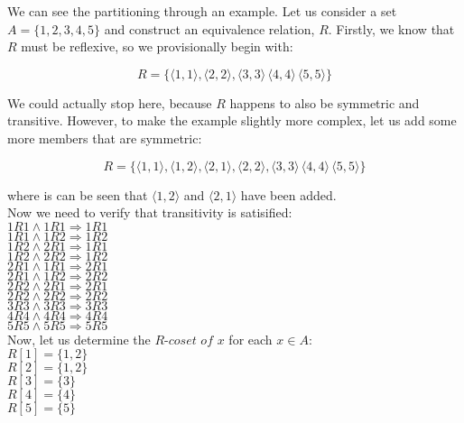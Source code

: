 We can see the partitioning through an example.  Let us consider a set $A=\{1,2,3,4,5\}$ and construct an equivalence relation, $R$.  Firstly, we know that $R$ must be reflexive, so we provisionally begin with:

\begin{displaymath}
R=\{ \langle 1,1 \rangle, \langle 2,2 \rangle, \langle 3,3 \rangle\, \langle 4,4 \rangle\, \langle 5,5 \rangle\}
\end{displaymath}

We could actually stop here, because $R$ happens to also be symmetric and transitive.  However, to make the example slightly more complex, let us add some more members that are symmetric:

\begin{displaymath}
R=\{ \langle 1,1 \rangle,  \langle 1,2 \rangle, \langle 2,1 \rangle, \langle 2,2 \rangle, \langle 3,3 \rangle\, \langle 4,4 \rangle\, \langle 5,5 \rangle\}
\end{displaymath}

where is can be seen that $\langle 1,2 \rangle$ and $\langle 2,1 \rangle$ have been added.\\
Now we need to verify that transitivity is satisified:\\
$1R1 \land 1R1 \Longrightarrow 1R1$ \\
$1R1 \land 1R2 \Longrightarrow 1R2$ \\
$1R2 \land 2R1 \Longrightarrow 1R1$ \\
$1R2 \land 2R2 \Longrightarrow 1R2$ \\
$2R1 \land 1R1 \Longrightarrow 2R1$ \\
$2R1 \land 1R2 \Longrightarrow 2R2$ \\
$2R2 \land 2R1 \Longrightarrow 2R1$ \\
$2R2 \land 2R2 \Longrightarrow 2R2$ \\
$3R3 \land 3R3 \Longrightarrow 3R3$ \\
$4R4 \land 4R4 \Longrightarrow 4R4$ \\
$5R5 \land 5R5 \Longrightarrow 5R5$ \\


Now, let us determine the $R \textit{-coset of }x$ for each $x \in A$:\\
$R[1]=\{1,2\}$\\
$R[2]=\{1,2\}$\\
$R[3]=\{3\}$\\
$R[4]=\{4\}$\\
$R[5]=\{5\}$\\

